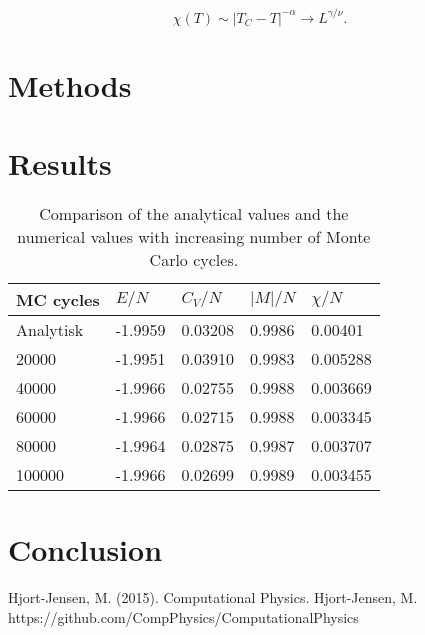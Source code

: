 \documentclass[twoside,twocolumn]{article}
\begin{document}
\begin{equation}
  \chi(T) \sim \left|T_C-T\right|^{-\alpha} \rightarrow L^{\gamma/\nu}.
  \label{eq:scale3}
\end{equation}
\section{Methods}



\section{Results}
\begin{table}[]
\begin{tabular}{|l|l|l|l|l|}
\hline
MC cycles &  ${E}/{N}$   & ${C_V}/{N}$    & ${|M|}/{N}$      & $ \chi/{N} $     \\ \hline
Analytisk & -1.9959 & 0.03208   & 0.9986   & 0.00401  \\ \hline
20000     & -1.9951 & 0.03910 & 0.9983 & 0.005288 \\ \hline
40000     & -1.9966 & 0.02755 & 0.9988 & 0.003669 \\ \hline
60000     & -1.9966 & 0.02715 & 0.9988 & 0.003345 \\ \hline
80000     & -1.9964 & 0.02875 & 0.9987 & 0.003707 \\ \hline
100000    & -1.9966 & 0.02699 & 0.9989 & 0.003455 \\ \hline
\end{tabular}
\caption{Comparison of the analytical values and the numerical values with increasing number of Monte Carlo cycles.}
\label{tab:my-table}
\end{table}


\section{Conclusion}


\begin{thebibliography}{99} %
Hjort-Jensen, M. (2015).
\newblock Computational Physics.
Hjort-Jensen, M.
\newblock https://github.com/CompPhysics/ComputationalPhysics

 
\end{thebibliography}

\end{document}
